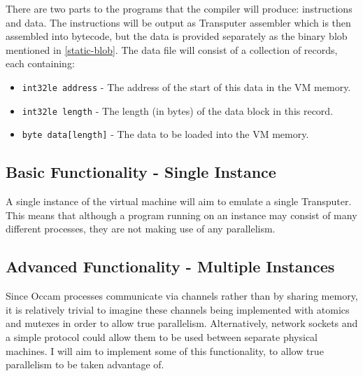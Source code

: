 There are two parts to the programs that the compiler will produce:
instructions and data. The instructions will be output as Transputer assembler
which is then assembled into bytecode, but the data is provided separately as
the binary blob mentioned in \ref{static-blob}. The data file will consist of a
collection of records, each containing:
\begin{itemize}
  \item
    \texttt{int32le address} - The address of the start of this data in the VM
    memory.
  \item
    \texttt{int32le length} - The length (in bytes) of the data block in this
    record.
  \item
    \texttt{byte data[length]} - The data to be loaded into the VM memory.
\end{itemize}

\subsection{Basic Functionality - Single Instance}

A single instance of the virtual machine will aim to emulate a single
Transputer. This means that although a program running on an instance may
consist of many different processes, they are not making use of any parallelism.

\subsection{Advanced Functionality - Multiple Instances}

Since Occam processes communicate via channels rather than by sharing memory, it
is relatively trivial to imagine these channels being implemented with atomics
and mutexes in order to allow true parallelism. Alternatively, network sockets
and a simple protocol could allow them to be used between separate physical
machines. I will aim to implement some of this functionality, to allow true
parallelism to be taken advantage of.
